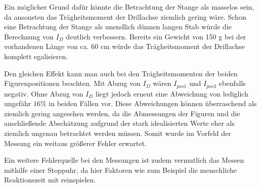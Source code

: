 Ein möglicher Grund dafür könnte die Betrachtung der Stange als masselos sein, da ansonsten das
Trägheitsmoment der Drillachse ziemlich gering wäre. Schon eine Betrachtung der Stange als unendlich dünnen
langen Stab würde die Berechnung von $I_D$ deutlich verbessern. Bereits ein Gewicht von 150 g bei der vorhandenen
Länge von ca. 60 cm würde das Trägheitsmoment der Drillachse komplett egalisieren.

Den gleichen Effekt kann man auch bei den Trägheitsmomenten der beiden Figurenpositionen beachten. Mit
Abzug von $I_D$ wären $I_{pos1}$ und $I_{pos2}$ ebenfalls negativ. Ohne Abzug von $I_D$ liegt jedoch
erneut eine Abweichung von lediglich ungefähr $16 \%$ in beiden Fällen vor. Diese Abweichungen können
überraschend als ziemlich gering angesehen werden, da die Abmessungen der Figuren und die anschließende
Abschätzung aufgrund der stark idealisierten Werte eher als ziemlich ungenau betrachtet werden müssen.
Somit wurde im Vorfeld der Messung ein weitaus größerer Fehler erwartet.

Ein weitere Fehlerquelle bei den Messungen ist zudem vermutlich das Messen mithilfe einer Stoppuhr,
da hier Faktoren wie zum Beispiel die menschliche Reaktionszeit mit reinspielen.

\newpage

\printbibliography


